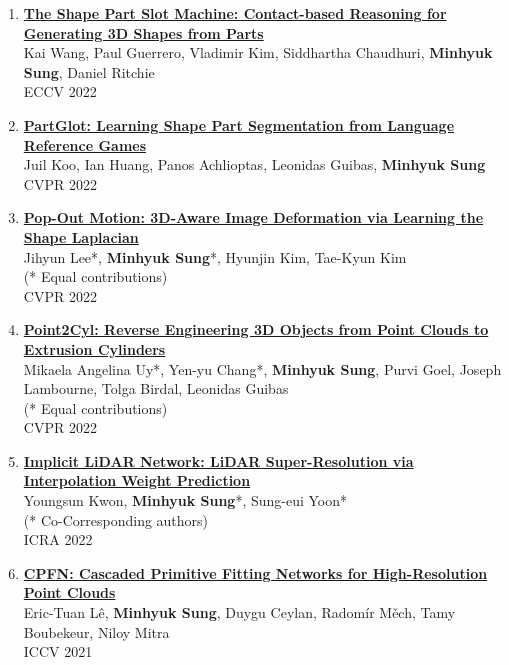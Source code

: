 \documentclass[letterpaper,10pt]{article} %
\newcommand{\blankline}{\quad\pagebreak[2]}
\begin{document}
{{\begin{enumerate}
\item \label{eccv22}
\href{https://arxiv.org/abs/2112.00584}{\textbf{The Shape Part Slot Machine: Contact-based Reasoning for Generating 3D Shapes from Parts}}\\
Kai Wang, Paul Guerrero, Vladimir Kim, Siddhartha Chaudhuri, \textbf{Minhyuk Sung}, Daniel Ritchie\\
ECCV 2022\\
\blankline

\item \label{cvpr22_2}
\href{https://arxiv.org/abs/2112.06390}{\textbf{PartGlot: Learning Shape Part Segmentation from Language Reference Games}}\\
Juil Koo, Ian Huang, Panos Achlioptas, Leonidas Guibas, \textbf{Minhyuk Sung}\\
CVPR 2022\\
\blankline

\item \label{cvpr22_2}
\href{https://arxiv.org/abs/2203.15235}{\textbf{Pop-Out Motion: 3D-Aware Image Deformation via Learning the Shape Laplacian}}\\
Jihyun Lee*, \textbf{Minhyuk Sung}*, Hyunjin Kim, Tae-Kyun Kim\\
(* Equal contributions)\\
CVPR 2022\\
\blankline

\item \label{cvpr22_1}
\href{https://arxiv.org/abs/2109.02259}{\textbf{Point2Cyl: Reverse Engineering 3D Objects from Point Clouds to Extrusion Cylinders}}\\
Mikaela Angelina Uy*, Yen-yu Chang*, \textbf{Minhyuk Sung}, Purvi Goel, Joseph Lambourne, Tolga Birdal, Leonidas Guibas\\
(* Equal contributions)\\
CVPR 2022\\
\blankline

\item \label{icra22}
\href{https://arxiv.org/abs/2203.06413}{\textbf{Implicit LiDAR Network: LiDAR Super-Resolution via Interpolation Weight Prediction}}\\
Youngsun Kwon, \textbf{Minhyuk Sung}*, Sung-eui Yoon*\\
(* Co-Corresponding authors)\\
ICRA 2022\\
\blankline

\item \label{iccv21_2}
\href{https://arxiv.org/abs/2109.00113}{\textbf{CPFN: Cascaded Primitive Fitting Networks for High-Resolution Point Clouds}}\\
Eric-Tuan Lê, \textbf{Minhyuk Sung}, Duygu Ceylan, Radomír Měch, Tamy Boubekeur, Niloy Mitra\\
ICCV 2021\\
\blankline


\end{enumerate}}}
\end{document}
